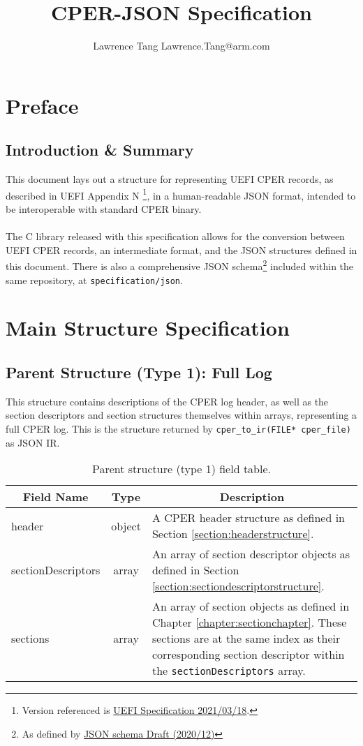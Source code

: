 \documentclass{report}
\title{CPER-JSON Specification}
\author{\parbox{\linewidth}{\centering%
Lawrence Tang\endgraf
Lawrence.Tang@arm.com\endgraf\medskip}}
\date{\parbox{\linewidth}{\centering%
Revision v0.0.1 (\today)\endgraf
First revision released [DATE].}}
\newcommand*{\thead}[1]{\multicolumn{1}{|c|}{\bfseries #1}}
\newcommand*{\jsontable}[1]{
    \begin{table}[!ht]
    \label{#1}
    \centering
    \begin{adjustbox}{center}
    \begin{tabular}{|l|c|p{8cm}|}
    \hline
    \thead{Field Name} & \thead{Type} & \thead{Description} \\
    \hline
}
\newcommand*{\jsontableend}[1]{
    \hline
    \end{tabular}
    \end{adjustbox}
    \caption{#1}
    \label{table:#1}
    \end{table}
    \FloatBarrier
}
\begin{document}
\maketitle
\tableofcontents
\listoftables

\chapter{Preface}
\section{Introduction \& Summary}
This document lays out a structure for representing UEFI CPER records, as described in UEFI Appendix N
\footnote{Version referenced is \href{https://uefi.org/sites/default/files/resources/UEFI_Spec_2_9_2021_03_18.pdf}{UEFI Specification 2021/03/18}.},
 in a human-readable JSON format, intended to be interoperable with standard CPER binary.
\\\\
The C library released with this specification allows for the conversion between UEFI CPER records, an intermediate format, and the JSON structures
defined in this document. There is also a comprehensive JSON schema\footnote{As defined by \href{https://json-schema.org/draft/2020-12/json-schema-core.html}{JSON schema Draft (2020/12)}} included within the same repository, at \texttt{specification/json}.

\chapter{Main Structure Specification}
\section{Parent Structure (Type 1): Full Log}
\label{section:parentstructuretype1}
This structure contains descriptions of the CPER log header, as well as the section descriptors and
section structures themselves within arrays, representing a full CPER log. This is the structure returned by \texttt{cper\_to\_ir(FILE* cper\_file)} as JSON IR.

\jsontable{table:parentstructuretype1}
header & object & A CPER header structure as defined in Section \ref{section:headerstructure}. \\
\hline
sectionDescriptors & array & An array of section descriptor objects as defined in Section \ref{section:sectiondescriptorstructure}. \\
\hline
sections & array & An array of section objects as defined in Chapter \ref{chapter:sectionchapter}. These sections are at the same index as their corresponding section descriptor within the \texttt{sectionDescriptors} array.\\
\jsontableend{Parent structure (type 1) field table.}
\end{document}
